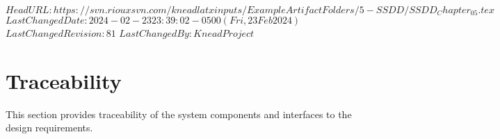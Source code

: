 \svnidlong
{$HeadURL: https://svn.riouxsvn.com/kneadlatxinputs/ExampleArtifactFolders/5-SSDD/SSDD_Chapter_05.tex $}
{$LastChangedDate: 2024-02-23 23:39:02 -0500 (Fri, 23 Feb 2024) $}
{$LastChangedRevision: 81 $}
{$LastChangedBy: KneadProject $}


\chapter{Traceability}
\label{loc:Traceability}

This section provides traceability of the system components and interfaces to the design requirements.
